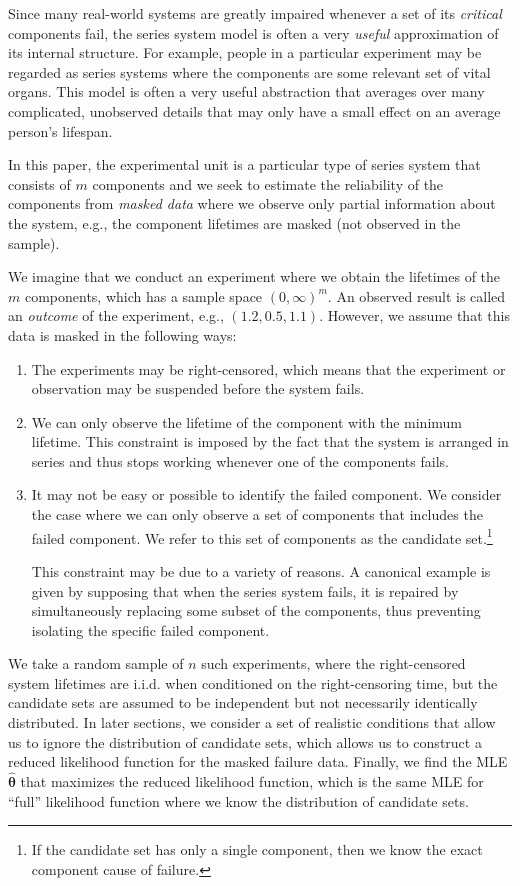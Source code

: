 \documentclass[
]{article}
\begin{document}
Since many real-world systems are greatly impaired whenever a set of its
\emph{critical} components fail, the series system model is often a very
\emph{useful} approximation of its internal structure. For example,
people in a particular experiment may be regarded as series systems
where the components are some relevant set of vital organs. This model
is often a very useful abstraction that averages over many complicated,
unobserved details that may only have a small effect on an average
person's lifespan.

In this paper, the experimental unit is a particular type of series
system that consists of \(m\) components and we seek to estimate the
reliability of the components from \emph{masked data} where we observe
only partial information about the system, e.g., the component lifetimes
are masked (not observed in the sample).

We imagine that we conduct an experiment where we obtain the lifetimes
of the \(m\) components, which has a sample space \((0,\infty)^m\). An
observed result is called an \emph{outcome} of the experiment, e.g.,
\((1.2,0.5,1.1)\). However, we assume that this data is masked in the
following ways:

\begin{enumerate}
\def\labelenumi{\arabic{enumi}.}
\item
  The experiments may be right-censored, which means that the experiment
  or observation may be suspended before the system fails.
\item
  We can only observe the lifetime of the component with the minimum
  lifetime. This constraint is imposed by the fact that the system is
  arranged in series and thus stops working whenever one of the
  components fails.
\item
  It may not be easy or possible to identify the failed component. We
  consider the case where we can only observe a set of components that
  includes the failed component. We refer to this set of components as
  the candidate set.\footnote{
  If the candidate set has only a single component, then we know the exact
  component cause of failure.}

  This constraint may be due to a variety of reasons. A canonical
  example is given by supposing that when the series system fails, it is
  repaired by simultaneously replacing some subset of the components,
  thus preventing isolating the specific failed component.
\end{enumerate}

We take a random sample of \(n\) such experiments, where the
right-censored system lifetimes are i.i.d. when conditioned on the
right-censoring time, but the candidate sets are assumed to be
independent but not necessarily identically distributed. In later
sections, we consider a set of realistic conditions that allow us to
ignore the distribution of candidate sets, which allows us to construct
a reduced likelihood function for the masked failure data. Finally, we
find the MLE \(\hat{\boldsymbol{\theta}}\) that maximizes the reduced
likelihood function, which is the same MLE for ``full'' likelihood
function where we know the distribution of candidate sets.
\end{document}
